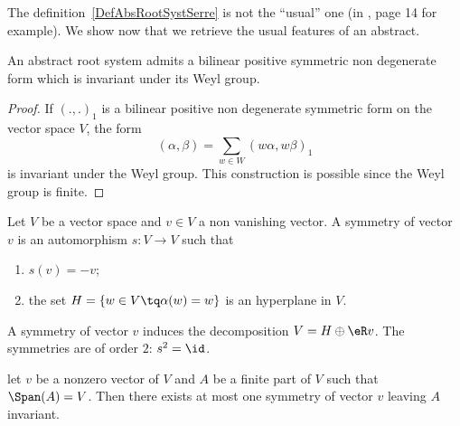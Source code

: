 The definition~\ref{DefAbsRootSystSerre} is not the ``usual'' one (in \cite{Wisser}, page 14 for example). We show now that we retrieve the usual features of an abstract.

\begin{lemma}
	An abstract root system admits a bilinear positive symmetric non degenerate form which is invariant under its Weyl group.
\end{lemma}

\begin{proof}
	If \( (.,.)_1\) is a bilinear positive non degenerate symmetric form on the vector space \( V\), the form
	\begin{equation}
		(\alpha,\beta)=\sum_{w\in W}(w\alpha,w\beta)_1
	\end{equation}
	is invariant under the Weyl group. This construction is possible since the Weyl group is finite.
\end{proof}

\begin{definition}
	Let \( V\) be a vector space and \( v\in V\) a non vanishing vector. A symmetry of vector \( v\) is an automorphism \( s\colon V\to V\) such that
	\begin{enumerate}
		\item
		      \( s(v)=-v\);
		\item
		      the set \( H=\{ w\in V\tq \alpha(w)=w \}\) is an hyperplane in \( V\).
	\end{enumerate}
\end{definition}
A symmetry of vector \( v\) induces the decomposition \( V=H\oplus\eR v\). The symmetries are of order \( 2\): \( s^2=\id\).

\begin{lemma}
	let \( v\) be a nonzero vector of \( V\) and \( A\) be a finite part of \( V\) such that \( \Span(A)=V\). Then there exists at most one symmetry of vector \( v\) leaving \( A\) invariant.
\end{lemma}

